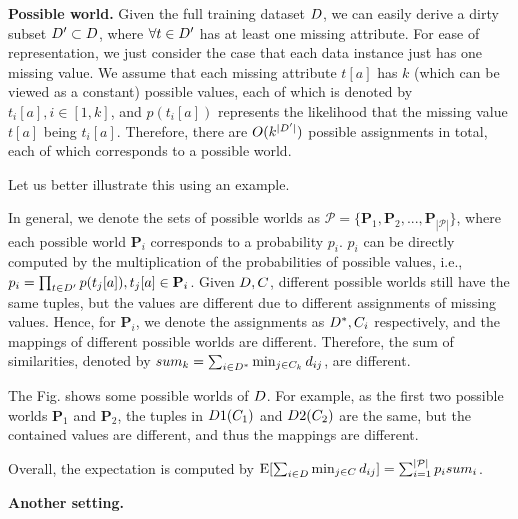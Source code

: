 \noindent \textbf{Possible world.} Given the full training dataset $D$, we  can easily derive a dirty subset $D' \subset D$, where $\forall t\in D'$ has at least one missing attribute. For ease of representation, we just consider the case that each data instance just has one missing value.  We assume that each missing attribute $t[a]$ has $k$ (which can be viewed as a constant) possible values, each of which is denoted by $t_i[a], i\in[1,k]$, and $p(t_i[a])$ represents the likelihood that the missing value $t[a]$ being $t_i[a]$.
Therefore, there are $O(k^{|D'|})$ possible  assignments in total, each of which corresponds to a possible world. 

Let us better illustrate this using an example.



In general, we denote the sets of possible worlds as $\mathcal{P} = \{\mathbf{P}_1, \mathbf{P}_2, ..., \mathbf{P}_{|\mathcal{P}|}\}$, where each possible world $\mathbf{P}_i$ corresponds to a probability $p_i$.
$p_i$ can be directly computed by the multiplication of the probabilities of possible values, i.e., $p_i = \prod_{t\in D'} p(t_j[a]), t_j[a] \in \mathbf{P}_i$.  
Given $D,C$,  different possible worlds still have the same tuples, but the values are different due to different assignments of missing values. Hence, for $\mathbf{P}_i$, we denote the assignments as $D^*,C_i$ respectively, and the mappings of different possible worlds are different. Therefore, the sum of similarities, denoted by $sum_k = \sum_{i\in D^*} \min_{j\in C_k} d_{ij} $, are different.

\begin{example}
	The Fig. shows some possible worlds of $D$. For example, as the first two possible worlds $\mathbf{P}_1$ and $\mathbf{P}_2$, the tuples in $D 1 (C_1)$ and  $D 2(C_2)$ are the same, but the contained values are different, and thus the mappings are different. 
\end{example}

Overall, the expectation is computed by $\mathrm{E}[\sum_{i\in D} \min_{j\in C} d_{ij}] = \sum_{i=1}^{|\mathcal{P}|} p_i sum_i$.

\noindent \textbf{Another setting.}





